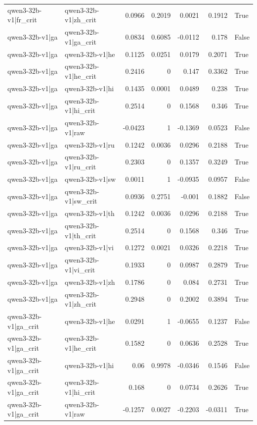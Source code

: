 \begin{table}
\begin{tabular}{l l r r r r l}
qwen3-32b-v1|fr_crit & qwen3-32b-v1|zh_crit & 0.0966 & 0.2019 & 0.0021 & 0.1912 & True \\
qwen3-32b-v1|ga & qwen3-32b-v1|ga_crit & 0.0834 & 0.6085 & -0.0112 & 0.178 & False \\
qwen3-32b-v1|ga & qwen3-32b-v1|he & 0.1125 & 0.0251 & 0.0179 & 0.2071 & True \\
qwen3-32b-v1|ga & qwen3-32b-v1|he_crit & 0.2416 & 0 & 0.147 & 0.3362 & True \\
qwen3-32b-v1|ga & qwen3-32b-v1|hi & 0.1435 & 0.0001 & 0.0489 & 0.238 & True \\
qwen3-32b-v1|ga & qwen3-32b-v1|hi_crit & 0.2514 & 0 & 0.1568 & 0.346 & True \\
qwen3-32b-v1|ga & qwen3-32b-v1|raw & -0.0423 & 1 & -0.1369 & 0.0523 & False \\
qwen3-32b-v1|ga & qwen3-32b-v1|ru & 0.1242 & 0.0036 & 0.0296 & 0.2188 & True \\
qwen3-32b-v1|ga & qwen3-32b-v1|ru_crit & 0.2303 & 0 & 0.1357 & 0.3249 & True \\
qwen3-32b-v1|ga & qwen3-32b-v1|sw & 0.0011 & 1 & -0.0935 & 0.0957 & False \\
qwen3-32b-v1|ga & qwen3-32b-v1|sw_crit & 0.0936 & 0.2751 & -0.001 & 0.1882 & False \\
qwen3-32b-v1|ga & qwen3-32b-v1|th & 0.1242 & 0.0036 & 0.0296 & 0.2188 & True \\
qwen3-32b-v1|ga & qwen3-32b-v1|th_crit & 0.2514 & 0 & 0.1568 & 0.346 & True \\
qwen3-32b-v1|ga & qwen3-32b-v1|vi & 0.1272 & 0.0021 & 0.0326 & 0.2218 & True \\
qwen3-32b-v1|ga & qwen3-32b-v1|vi_crit & 0.1933 & 0 & 0.0987 & 0.2879 & True \\
qwen3-32b-v1|ga & qwen3-32b-v1|zh & 0.1786 & 0 & 0.084 & 0.2731 & True \\
qwen3-32b-v1|ga & qwen3-32b-v1|zh_crit & 0.2948 & 0 & 0.2002 & 0.3894 & True \\
qwen3-32b-v1|ga_crit & qwen3-32b-v1|he & 0.0291 & 1 & -0.0655 & 0.1237 & False \\
qwen3-32b-v1|ga_crit & qwen3-32b-v1|he_crit & 0.1582 & 0 & 0.0636 & 0.2528 & True \\
qwen3-32b-v1|ga_crit & qwen3-32b-v1|hi & 0.06 & 0.9978 & -0.0346 & 0.1546 & False \\
qwen3-32b-v1|ga_crit & qwen3-32b-v1|hi_crit & 0.168 & 0 & 0.0734 & 0.2626 & True \\
qwen3-32b-v1|ga_crit & qwen3-32b-v1|raw & -0.1257 & 0.0027 & -0.2203 & -0.0311 & True \\

\end{tabular}
\end{table}
